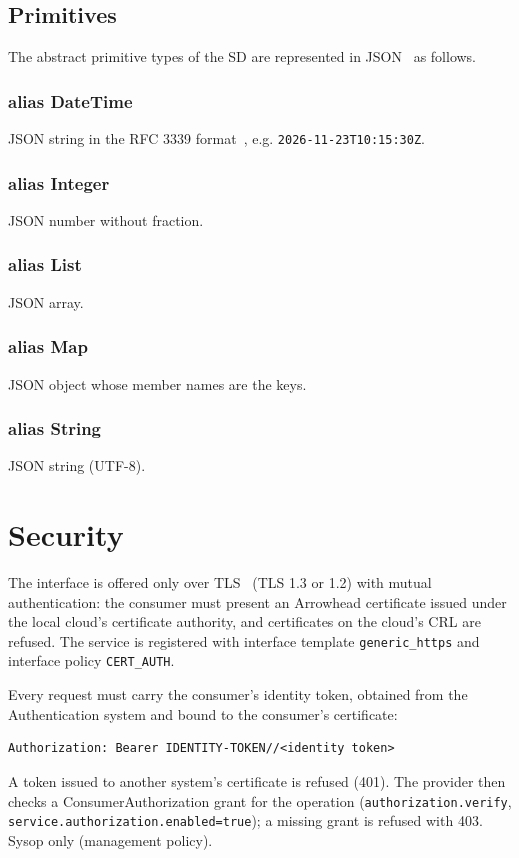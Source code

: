 \documentclass[a4paper]{arrowhead}
\newcommand{\pdef}[1]{{\textcolor{ArrowheadGrey}{#1\label{sec:model:primitives:#1}\label{sec:model:primitives:#1s}}}}
\begin{document}
\subsection{Primitives}
\label{sec:model:primitives}
The abstract primitive types of the SD are represented in JSON~\cite{rfc8259} as follows.
\subsubsection*{alias \pdef{DateTime}}
JSON string in the RFC 3339 format~\cite{rfc3339}, e.g. \texttt{2026-11-23T10:15:30Z}.

\subsubsection*{alias \pdef{Integer}}
JSON number without fraction.

\subsubsection*{alias \pdef{List}}
JSON array.

\subsubsection*{alias \pdef{Map}}
JSON object whose member names are the keys.

\subsubsection*{alias \pdef{String}}
JSON string (UTF-8).



\section{Security}
\label{sec:security}
The interface is offered only over TLS~\cite{rfc8446} (TLS 1.3 or 1.2) with mutual authentication: the consumer must
present an Arrowhead certificate issued under the local cloud's certificate authority, and certificates on the
cloud's CRL are refused. The service is registered with interface template \texttt{generic\_https} and interface
policy \texttt{CERT\_AUTH}.

Every request must carry the consumer's identity token, obtained from the Authentication system and bound to the
consumer's certificate:
\begin{lstlisting}
Authorization: Bearer IDENTITY-TOKEN//<identity token>
\end{lstlisting}
A token issued to another system's certificate is refused (401). The provider then checks a ConsumerAuthorization
grant for the operation (\texttt{authorization.verify}, \texttt{service.authorization.enabled=true}); a missing grant is
refused with 403. Sysop only (management policy).
\end{document}
